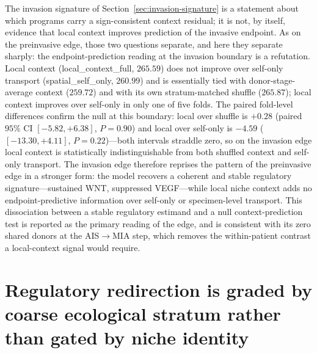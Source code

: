 The invasion signature of Section~\ref{sec:invasion-signature} is a statement about which programs carry a sign-consistent context residual; it is not, by itself, evidence that local context improves prediction of the invasive endpoint. As on the preinvasive edge, those two questions separate, and here they separate sharply: the endpoint-prediction reading at the invasion boundary is a refutation. Local context (local\_context\_full, $265.59$) does not improve over self-only transport (spatial\_self\_only, $260.99$) and is essentially tied with donor-stage-average context ($259.72$) and with its own stratum-matched shuffle ($265.87$); local context improves over self-only in only one of five folds. The paired fold-level differences confirm the null at this boundary: local over shuffle is $+0.28$ (paired $95\%$ CI $[-5.82, +6.38]$, $P = 0.90$) and local over self-only is $-4.59$ ($[-13.30, +4.11]$, $P = 0.22$)---both intervals straddle zero, so on the invasion edge local context is statistically indistinguishable from both shuffled context and self-only transport. The invasion edge therefore reprises the pattern of the preinvasive edge in a stronger form: the model recovers a coherent and stable regulatory signature---sustained WNT, suppressed VEGF---while local niche context adds no endpoint-predictive information over self-only or specimen-level transport. This dissociation between a stable regulatory estimand and a null context-prediction test is reported as the primary reading of the edge, and is consistent with its zero shared donors at the AIS$\rightarrow$MIA step, which removes the within-patient contrast a local-context signal would require.

\section{Regulatory redirection is graded by coarse ecological stratum rather than gated by niche identity}
\label{sec:niche_gating}

